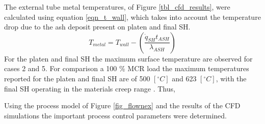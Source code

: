 \documentclass[review]{elsarticle}
\begin{document}
The external tube metal temperatures, of Figure \ref{tbl_cfd_results}, were calculated using equation \ref{eqn_t_wall}, which takes into account the temperature drop due to the ash deposit present on platen and final SH.
\begin{equation}\label{eqn_t_wall}
T_{metal} = T_{wall} - \left(\frac{\dot{q}_{SH}t_{ASH}}{\lambda_{ASH}}\right)
\end{equation}
For the platen and final SH the maximum surface temperature are observed for cases 2 and 5. For comparison a 100 \% MCR load the maximum temperatures reported for the platen and final SH are of 500 $[^\circ C]$ and 623 $[^\circ C]$, with the final SH operating in the materials creep range \cite{Laubscher2019b}. Thus, 


Using the process model of Figure \ref{fig_flownex} and the results of the CFD simulations the important process control parameters were determined. 
\end{document}

